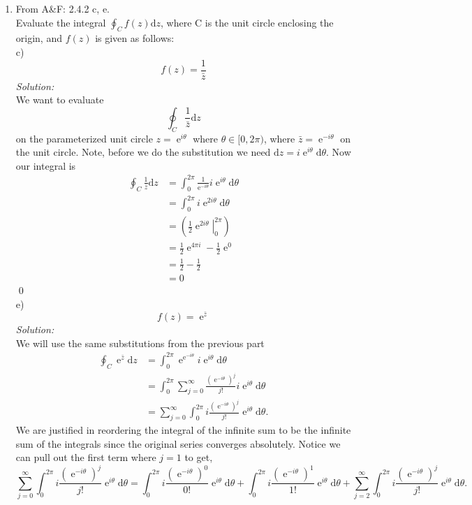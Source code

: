 \documentclass[10pt]{amsart}
\newcommand{\D}{\mathrm{d}}
\DeclareMathOperator{\E}{e}
\theoremstyle{nonumberplain}
\begin{document}
\begin{enumerate}[label={\bf {\arabic*}:}]
\item From A\&F: 2.4.2 c, e.\\
Evaluate the integral $\oint_Cf(z)\D z$, where C is the unit circle enclosing the origin, and $f(z)$ is given as follows: \\
c) $$f(z) = \frac {1} {\bar z}$$
\textit{Solution:} \\
We want to evaluate
$$
\oint_C\frac {1} {\bar z} \D z
$$
on the parameterized unit circle $z = \E^{i\theta}$ where $\theta \in [0, 2\pi)$, where $\bar z = \E^{-i\theta}$ on the unit circle.
Note, before we do the substitution we need $\D z = i\E^{i\theta} \D \theta$. Now our integral is
\begin{align*}
\oint_C\frac {1} {\bar z} \D z &= \int_0^{2\pi}\frac {1} {\E^{-i\theta}} i\E^{i \theta}\D \theta \\
					  &= \int_0^{2\pi} i \E^{2i \theta} \D \theta \\
					  &= \left( \left. \frac 1 2 \E^{2i\theta} \right|_0^{2\pi}\right) \\
					  &= \frac 1 2 \E^{4\pi i} - \frac 1 2 \E^{0} \\
					  &= \frac 1 2 - \frac 1 2 \\
					  &= 0
\end{align*}
\qed
\\
e) $$f(z) = \E^{\bar z}$$
\textit{Solution:} \\
We will use the same substitutions from the previous part
\begin{align*}
\oint_C\E^{\bar z} \D z &= \int_0^{2\pi}\E^{\E^{-i\theta}} i\E^{i \theta}\D \theta \\
				  &= \int_0^{2\pi} \sum_{j=0}^{\infty} \frac{\left(\E^{-i\theta}\right)^j}{j!} i\E^{i\theta} \D \theta \\
				  &= \sum_{j=0}^{\infty} \int_0^{2\pi} i \frac{\left(\E^{-i\theta}\right)^j}{j!} {\E^{i\theta}} \D \theta.
\end{align*}
We are justified in reordering the integral of the infinite sum to be the infinite sum of the integrals since the original series converges absolutely.
Notice we can pull out the first term where $j=1$ to get,
$$
\sum_{j=0}^{\infty} \int_0^{2\pi} i \frac{\left(\E^{-i\theta}\right)^j}{j!} {\E^{i\theta}} \D \theta
= \int_0^{2\pi} i \frac{\left(\E^{-i\theta}\right)^0}{0!} {\E^{i\theta}} \D \theta
+ \int_0^{2\pi} i \frac{\left(\E^{-i\theta}\right)^1}{1!} {\E^{i\theta}} \D \theta
+ \sum_{j=2}^{\infty} \int_0^{2\pi} i \frac{\left(\E^{-i\theta}\right)^j}{j!} {\E^{i\theta}} \D \theta.
$$
\end{enumerate}
\end{document}
